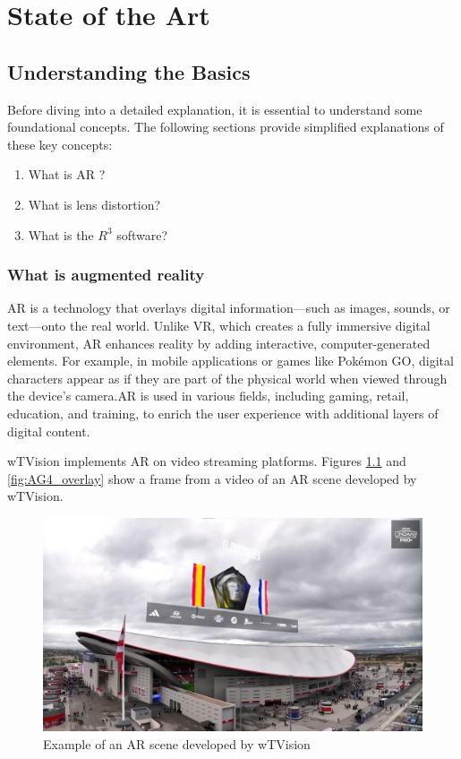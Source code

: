 \chapter{State of the Art}\label{chap:state_art}

\section{Understanding the Basics}

\noindent Before diving into a detailed explanation, it is essential to understand some foundational concepts. The following sections provide simplified explanations of these key concepts:

\begin{enumerate}
    \item What is \ac{AR} ?
    \item What is lens distortion?
    \item What is the $R^3$ software?
\end{enumerate}

\subsection{What is augmented reality}

\noindent \ac{AR} is a technology that overlays digital information—such as images, sounds, or text—onto the real world. Unlike \ac{VR}, which creates a fully immersive digital environment, \ac{AR} enhances reality by adding interactive, computer-generated elements. For example, in mobile applications or games like Pokémon GO, digital characters appear as if they are part of the physical world when viewed through the device's camera.\ac{AR} is used in various fields, including gaming, retail, education, and training, to enrich the user experience with additional layers of digital content.

\noindent wTVision implements \ac{AR} on video streaming platforms. Figures \ref{fig:AG_4} and \ref{fig:AG4_overlay} show a frame from a video of an \ac{AR} scene developed by wTVision.

\begin{figure}[h]
    \centering
    \includegraphics[width=\textwidth]{Images/02stateart/AG_4.jpeg}
    \caption{Example of an \ac{AR} scene developed by wTVision}
    \label{fig:AG_4}
\end{figure}


